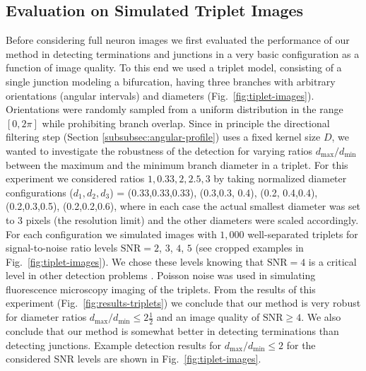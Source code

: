 \subsection{Evaluation on Simulated Triplet Images}
\label{subsec:experiments-triplets}
Before considering full neuron images we first evaluated the performance of our method in detecting terminations and junctions in a very basic configuration as a function of image quality. To this end we used a triplet model, consisting of a single junction modeling a bifurcation, having three branches with arbitrary orientations (angular intervals) and diameters (Fig.~\ref{fig:tiplet-images}). Orientations were randomly sampled from a uniform distribution in the range $[0,2\pi]$ while prohibiting branch overlap. Since in principle the directional filtering step (Section \ref{subsubsec:angular-profile}) uses a fixed kernel size $D$, we wanted to investigate the robustness of the detection for varying ratios $d_{\max}/d_{\min}$ between the maximum and the minimum branch diameter in a triplet. For this experiment we considered ratios $1,0.33,2,2.5,3$ by taking normalized diameter configurations ($d_1,d_2,d_3$) = (0.33,0.33,0.33), (0.3,0.3, 0.4), (0.2, 0.4,0.4), (0.2,0.3,0.5), (0.2,0.2,0.6), where in each case the actual smallest diameter was set to 3 pixels (the resolution limit) and the other diameters were scaled accordingly. For each configuration we simulated images with $1,000$ well-separated triplets for signal-to-noise ratio levels $\textrm{SNR}=2$, $3$, $4$, $5$ (see cropped examples in Fig.~\ref{fig:tiplet-images}). We chose these levels knowing that $\textrm{SNR}=4$ is a critical level in other detection problems \cite{smal2010quantitative, chenouard2014objective}. Poisson noise was used in simulating fluorescence microscopy imaging of the triplets. From the results of this experiment (Fig.~\ref{fig:results-triplets}) we conclude that our method is very robust for diameter ratios $d_{\max}/d_{\min}\leq2\frac{1}{2}$ and an image quality of $\textrm{SNR}\geq4$. We also conclude that our method is somewhat better in detecting terminations than detecting junctions. Example detection results for $d_{\max}/d_{\min}\leq2$ for the considered SNR levels are shown in Fig.~\ref{fig:tiplet-images}.

